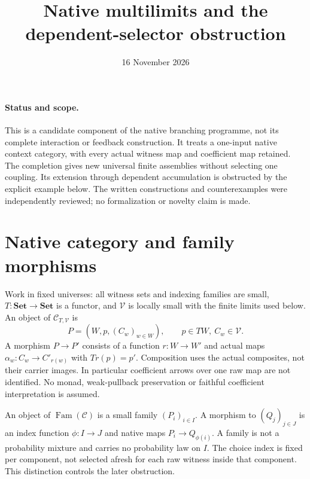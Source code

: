 \documentclass[11pt]{article}
\title{Native multilimits and the dependent-selector obstruction}
\date{16 November 2026}
\begin{document}
\maketitle
\paragraph{Status and scope.} This is a candidate component of the native branching programme, not its complete interaction or feedback construction. It treats a one-input native context category, with every actual witness map and coefficient map retained. The completion gives new universal finite assemblies without selecting one coupling. Its extension through dependent accumulation is obstructed by the explicit example below. The written constructions and counterexamples were independently reviewed; no formalization or novelty claim is made.

\section{Native category and family morphisms}
Work in fixed universes: all witness sets and indexing families are small, $T:\mathbf{Set}\to\mathbf{Set}$ is a functor, and $\mathcal V$ is locally small with the finite limits used below. An object of $\mathcal C_{T,\mathcal V}$ is
\[
 P=(W,p,(C_w)_{w\in W}),\qquad p\in TW,\ C_w\in\mathcal V.
\]
A morphism $P\to P'$ consists of a function $r:W\to W'$ and actual maps $\alpha_w:C_w\to C'_{r(w)}$ with $Tr(p)=p'$. Composition uses the actual composites, not their carrier images. In particular coefficient arrows over one raw map are not identified. No monad, weak-pullback preservation or faithful coefficient interpretation is assumed.

An object of $\operatorname{Fam}(\mathcal C)$ is a small family $(P_i)_{i\in I}$. A morphism to $(Q_j)_{j\in J}$ is an index function $\phi:I\to J$ and native maps $P_i\to Q_{\phi(i)}$. A family is not a probability mixture and carries no probability law on $I$. The choice index is fixed per component, not selected afresh for each raw witness inside that component. This distinction controls the later obstruction.
\end{document}
